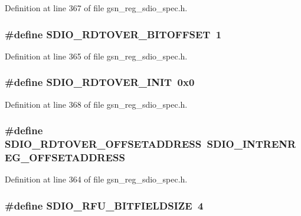 Definition at line 367 of file gsn\_\-reg\_\-sdio\_\-spec.h.

\hypertarget{a00571_a89726e861a347a184d20982bdf4484e3}{
\subsubsection[{SDIO\_\-RDTOVER\_\-BITOFFSET}]{\setlength{\rightskip}{0pt plus 5cm}\#define SDIO\_\-RDTOVER\_\-BITOFFSET~1}}
\label{a00571_a89726e861a347a184d20982bdf4484e3}


Definition at line 365 of file gsn\_\-reg\_\-sdio\_\-spec.h.

\hypertarget{a00571_aaba0efe5e837ba9b3f4ec3b58a278754}{
\subsubsection[{SDIO\_\-RDTOVER\_\-INIT}]{\setlength{\rightskip}{0pt plus 5cm}\#define SDIO\_\-RDTOVER\_\-INIT~0x0}}
\label{a00571_aaba0efe5e837ba9b3f4ec3b58a278754}


Definition at line 368 of file gsn\_\-reg\_\-sdio\_\-spec.h.

\hypertarget{a00571_a73d7df586f8aab8850d5d9ab7c4470c7}{
\subsubsection[{SDIO\_\-RDTOVER\_\-OFFSETADDRESS}]{\setlength{\rightskip}{0pt plus 5cm}\#define SDIO\_\-RDTOVER\_\-OFFSETADDRESS~SDIO\_\-INTRENREG\_\-OFFSETADDRESS}}
\label{a00571_a73d7df586f8aab8850d5d9ab7c4470c7}


Definition at line 364 of file gsn\_\-reg\_\-sdio\_\-spec.h.

\hypertarget{a00571_aede702162461d94be59f4a8866df4ec0}{
\subsubsection[{SDIO\_\-RFU\_\-BITFIELDSIZE}]{\setlength{\rightskip}{0pt plus 5cm}\#define SDIO\_\-RFU\_\-BITFIELDSIZE~4}}
\label{a00571_aede702162461d94be59f4a8866df4ec0}


